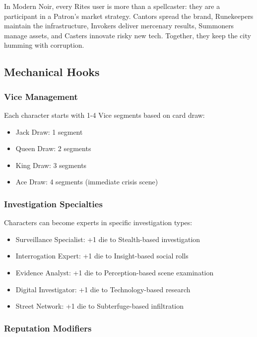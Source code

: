 \documentclass[11pt]{article}
\begin{document}
\begin{tcolorbox}[colback=black!2,colframe=black!40!white,title={Noir Table Stakes},breakable]
In Modern Noir, every Rites user is more than a spellcaster: they are a participant in a Patron's market strategy.
Cantors spread the brand, Runekeepers maintain the infrastructure, Invokers deliver mercenary results, Summoners manage assets, and Casters innovate risky new tech. Together, they keep the city humming with corruption.
\end{tcolorbox}

\subsection{Mechanical Hooks}

\subsubsection{Vice Management}

Each character starts with 1-4 Vice segments based on card draw:
\begin{itemize}
\item Jack Draw: 1 segment
\item Queen Draw: 2 segments
\item King Draw: 3 segments  
\item Ace Draw: 4 segments (immediate crisis scene)
\end{itemize}

\subsubsection{Investigation Specialties}

Characters can become experts in specific investigation types:
\begin{itemize}
\item Surveillance Specialist: +1 die to Stealth-based investigation
\item Interrogation Expert: +1 die to Insight-based social rolls
\item Evidence Analyst: +1 die to Perception-based scene examination
\item Digital Investigator: +1 die to Technology-based research
\item Street Network: +1 die to Subterfuge-based infiltration
\end{itemize}

\subsubsection{Reputation Modifiers}
\end{document}
